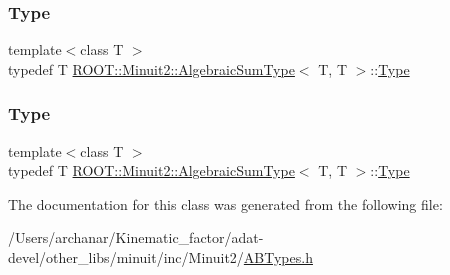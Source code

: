 \mbox{\label{classROOT_1_1Minuit2_1_1AlgebraicSumType_3_01T_00_01T_01_4_a840029212ccc1ff6fce3aeb7ec3187de}} 
\subsubsection{\texorpdfstring{Type}{Type}\hspace{0.1cm}{\footnotesize\ttfamily [2/3]}}
{\footnotesize\ttfamily template$<$class T $>$ \\
typedef T \mbox{\hyperlink{classROOT_1_1Minuit2_1_1AlgebraicSumType}{R\+O\+O\+T\+::\+Minuit2\+::\+Algebraic\+Sum\+Type}}$<$ T, T $>$\+::\mbox{\hyperlink{classROOT_1_1Minuit2_1_1AlgebraicSumType_3_01T_00_01T_01_4_a840029212ccc1ff6fce3aeb7ec3187de}{Type}}}

\mbox{\label{classROOT_1_1Minuit2_1_1AlgebraicSumType_3_01T_00_01T_01_4_a840029212ccc1ff6fce3aeb7ec3187de}} 
\subsubsection{\texorpdfstring{Type}{Type}\hspace{0.1cm}{\footnotesize\ttfamily [3/3]}}
{\footnotesize\ttfamily template$<$class T $>$ \\
typedef T \mbox{\hyperlink{classROOT_1_1Minuit2_1_1AlgebraicSumType}{R\+O\+O\+T\+::\+Minuit2\+::\+Algebraic\+Sum\+Type}}$<$ T, T $>$\+::\mbox{\hyperlink{classROOT_1_1Minuit2_1_1AlgebraicSumType_3_01T_00_01T_01_4_a840029212ccc1ff6fce3aeb7ec3187de}{Type}}}



The documentation for this class was generated from the following file\+:\begin{DoxyCompactItemize}
\item 
/\+Users/archanar/\+Kinematic\+\_\+factor/adat-\/devel/other\+\_\+libs/minuit/inc/\+Minuit2/\mbox{\hyperlink{adat-devel_2other__libs_2minuit_2inc_2Minuit2_2ABTypes_8h}{A\+B\+Types.\+h}}\end{DoxyCompactItemize}
